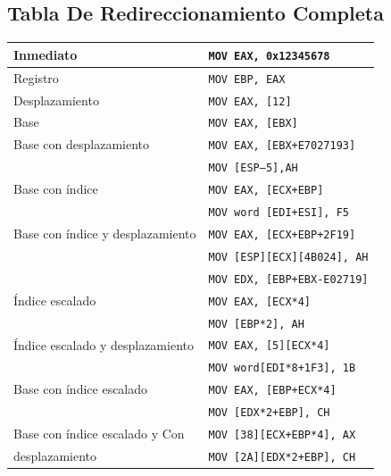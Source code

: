 \documentclass[12pt]{article}
\begin{document}
\subsection*{Tabla De Redireccionamiento Completa}
\label{sec:orgdd0e2de}
\begin{center}
\begin{tabular}{|l|l|}
\hline
Inmediato & \texttt{MOV EAX, 0x12345678}\\
\hline
Registro & \texttt{MOV EBP, EAX}\\
\hline
Desplazamiento & \texttt{MOV EAX, [12]}\\
\hline
Base & \texttt{MOV EAX, [EBX]}\\
\hline
Base con desplazamiento & \texttt{MOV EAX, [EBX+E7027193]}\\
 & \texttt{MOV [ESP–5],AH}\\
\hline
Base con índice & \texttt{MOV EAX, [ECX+EBP]}\\
 & \texttt{MOV word [EDI+ESI], F5}\\
\hline
Base con índice y desplazamiento & \texttt{MOV EAX, [ECX+EBP+2F19]}\\
 & \texttt{MOV [ESP][ECX][4B024], AH}\\
 & \texttt{MOV EDX, [EBP+EBX-E02719]}\\
\hline
Índice escalado & \texttt{MOV EAX, [ECX*4]}\\
 & \texttt{MOV [EBP*2], AH}\\
\hline
Índice escalado y desplazamiento & \texttt{MOV EAX, [5][ECX*4]}\\
 & \texttt{MOV word[EDI*8+1F3], 1B}\\
\hline
Base con índice escalado & \texttt{MOV EAX, [EBP+ECX*4]}\\
 & \texttt{MOV [EDX*2+EBP], CH}\\
\hline
Base con índice escalado y Con & \texttt{MOV [38][ECX+EBP*4], AX}\\
desplazamiento & \texttt{MOV [2A][EDX*2+EBP], CH}\\
\hline
\end{tabular}
\end{center}
\end{document}
